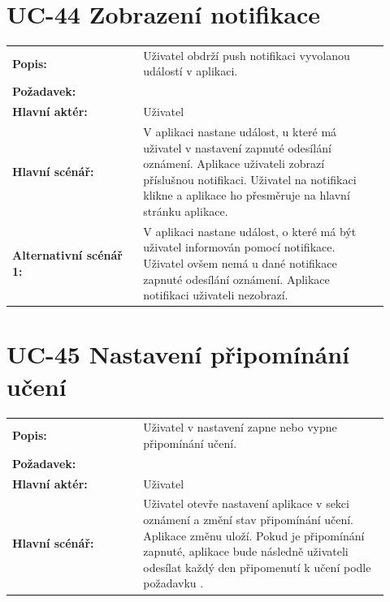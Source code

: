 \section{UC-44 Zobrazení notifikace}\label{sec:uc-44}

\begin{tabular}{p{0.32\linewidth}p{0.6\linewidth}}
  \textbf{Popis:} & Uživatel obdrží push notifikaci vyvolanou událostí v aplikaci. \\
  \textbf{Požadavek:} & \nameref{sec:fp-push-notifications} \\
  \textbf{Hlavní aktér:} & Uživatel \\
  \textbf{Hlavní scénář:} & V aplikaci nastane událost, u které má uživatel v nastavení zapnuté odesílání oznámení. Aplikace uživateli zobrazí příslušnou notifikaci. Uživatel na notifikaci klikne a aplikace ho přesměruje na hlavní stránku aplikace. \\
  \textbf{Alternativní scénář 1:} & V aplikaci nastane událost, o které má být uživatel informován pomocí notifikace. Uživatel ovšem nemá u dané notifikace zapnuté odesílání oznámení. Aplikace notifikaci uživateli nezobrazí. \\
\end{tabular}

\section{UC-45 Nastavení připomínání učení}\label{sec:uc-45}

\begin{tabular}{p{0.32\linewidth}p{0.6\linewidth}}
  \textbf{Popis:} & Uživatel v nastavení zapne nebo vypne připomínání učení. \\
  \textbf{Požadavek:} & \nameref{sec:fp-learning-reminder} \\
  \textbf{Hlavní aktér:} & Uživatel \\
  \textbf{Hlavní scénář:} & Uživatel otevře nastavení aplikace v sekci oznámení a změní stav připomínání učení. Aplikace změnu uloží. Pokud je připomínání zapnuté, aplikace bude následně uživateli odesílat každý den připomenutí k učení podle požadavku \nameref{sec:fp-push-notifications}. \\
\end{tabular}
